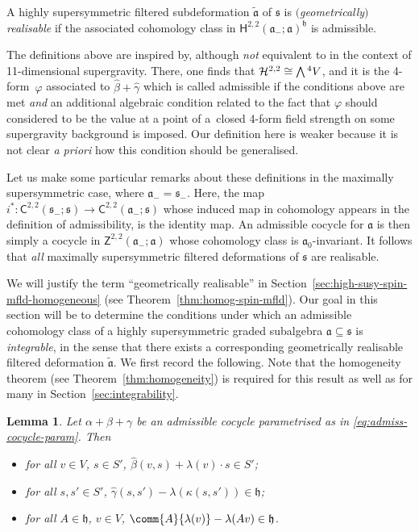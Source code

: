 \documentclass[pdftex]{sigma}
\numberwithin{equation}{section}
\newtheorem{Lemma}[Theorem]{Lemma}
\newcommand{\fa}{\mathfrak{a}}
\newcommand{\fh}{\mathfrak{h}}
\newcommand{\fs}{\mathfrak{s}}
\newcommand{\cH}{\mathcal{H}}
\newcommand{\ssC}{\mathsf{C}}
\newcommand{\ssH}{\mathsf{H}}
\newcommand{\ssZ}{\mathsf{Z}}
\newcommand{\betahat}{\widehat{\beta}}
\newcommand{\gammahat}{\widehat{\gamma}}
\newcommand{\fatilde}{\widetilde{\fa}}
\newcommand{\Wedge}{\mathchoice{{\textstyle\bigwedge}}{\bigwedge}{\bigwedge}{\bigwedge}}	%
\newcommand{\1}{\mathbbm{1}}
\begin{document}
\begin{Definition}\label{def:geom-real}
	A highly supersymmetric filtered subdeformation $\fatilde$ of $\fs$ is \emph{$($geometrically$)$ realisable} if the associated cohomology class in $\ssH^{2,2}(\fa_-;\fa)^\fh$ is admissible.
\end{Definition}

The definitions above are inspired by, although \emph{not} equivalent to \cite[Definition~9]{Figueroa-OFarrill2017_1} in the context of 11-dimensional supergravity. There, one finds that $\cH^{2,2}\cong \Wedge^4V$, and it is the 4-form~$\varphi$ associated to $\betahat+\gammahat$ which is called admissible if the conditions above are met \emph{and} an additional algebraic condition related to the fact that $\varphi$ should considered to be the value at a point of a~closed 4-form field strength on some supergravity background is imposed. Our definition here is weaker because it is not clear \textit{a priori} how this condition should be generalised.

Let us make some particular remarks about these definitions in the maximally supersymmetric case, where $\fa_-=\fs_-$. Here, the map $i^*\colon\ssC^{2,2}(\fs_-;\fs)\to\ssC^{2,2}(\fa_-;\fs)$ whose induced map in cohomology appears in the definition of admissibility, is the identity map. An admissible cocycle for $\fa$ is then simply a cocycle in $\ssZ^{2,2}(\fa_-;\fa)$ whose cohomology class is $\fa_0$-invariant. It follows that \emph{all} maximally supersymmetric filtered deformations of $\fs$ are realisable.

We will justify the term ``geometrically realisable'' in Section~\ref{sec:high-susy-spin-mfld-homogeneous} (see Theorem~\ref{thm:homog-spin-mfld}). Our goal in this section will be to determine the conditions under which an admissible cohomology class of a highly supersymmetric graded subalgebra $\fa\subseteq\fs$ is \emph{integrable}, in the sense that there exists a corresponding geometrically realisable filtered deformation $\fatilde$. We first record the following. Note that the homogeneity theorem (see Theorem~\ref{thm:homogeneity}) is required for this result as well as for many in Section~\ref{sec:integrability}.

\begin{Lemma}\label{lemma:admiss-props}
	Let $\alpha+\beta+\gamma$ be an admissible cocycle parametrised as in \eqref{eq:admiss-cocycle-param}. Then
	\begin{itemize}\itemsep=0pt
		\item for all $v\in V$, $s\in S'$, $\betahat(v,s)+\lambda(v)\cdot s \in S'$;
		\item for all $s,s'\in S'$, $\gammahat(s,s')-\lambda(\kappa(s,s'))\in\fh$;
		\item for all $A\in\fh$, $v\in V$, $\comm{A}{\lambda(v)}-\lambda(Av)\in\fh$.
	\end{itemize}
\end{Lemma}
\end{document}

